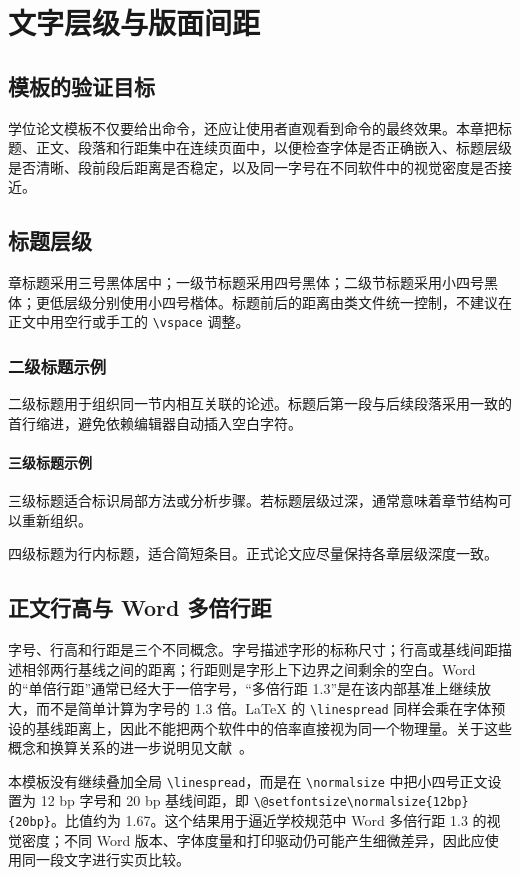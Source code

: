 \chapter{文字层级与版面间距}
\label{chap:introduction}

\section{模板的验证目标}
学位论文模板不仅要给出命令，还应让使用者直观看到命令的最终效果。本章把标题、正文、段落和行距集中在连续页面中，以便检查字体是否正确嵌入、标题层级是否清晰、段前段后距离是否稳定，以及同一字号在不同软件中的视觉密度是否接近。

\section{标题层级}
章标题采用三号黑体居中；一级节标题采用四号黑体；二级节标题采用小四号黑体；更低层级分别使用小四号楷体。标题前后的距离由类文件统一控制，不建议在正文中用空行或手工的 \verb|\vspace| 调整。

\subsection{二级标题示例}
二级标题用于组织同一节内相互关联的论述。标题后第一段与后续段落采用一致的首行缩进，避免依赖编辑器自动插入空白字符。

\subsubsection{三级标题示例}
三级标题适合标识局部方法或分析步骤。若标题层级过深，通常意味着章节结构可以重新组织。

四级标题为行内标题，适合简短条目。正式论文应尽量保持各章层级深度一致。

\section{正文行高与 Word 多倍行距}
字号、行高和行距是三个不同概念。字号描述字形的标称尺寸；行高或基线间距描述相邻两行基线之间的距离；行距则是字形上下边界之间剩余的空白。Word 的“单倍行距”通常已经大于一倍字号，“多倍行距 1.3”是在该内部基准上继续放大，而不是简单计算为字号的 1.3 倍。LaTeX 的 \verb|\linespread| 同样会乘在字体预设的基线距离上，因此不能把两个软件中的倍率直接视为同一个物理量。关于这些概念和换算关系的进一步说明见文献~\cite{wdlobin2026typesetting}。

本模板没有继续叠加全局 \verb|\linespread|，而是在 \verb|\normalsize| 中把小四号正文设置为 12 bp 字号和 20 bp 基线间距，即 \verb|\@setfontsize\normalsize{12bp}{20bp}|。比值约为 1.67。这个结果用于逼近学校规范中 Word 多倍行距 1.3 的视觉密度；不同 Word 版本、字体度量和打印驱动仍可能产生细微差异，因此应使用同一段文字进行实页比较。

